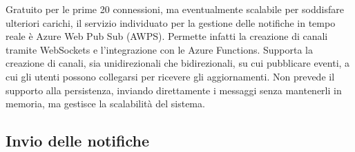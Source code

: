 Gratuito per le prime 20 connessioni, 
ma eventualmente scalabile per soddisfare ulteriori carichi, 
il servizio individuato per la gestione delle notifiche in tempo reale è Azure Web Pub Sub (AWPS). 
Permette infatti la creazione di canali tramite WebSockets e l'integrazione con le Azure Functions. 
Supporta la creazione di canali, sia unidirezionali che bidirezionali, su cui pubblicare eventi, 
a cui gli utenti possono collegarsi per ricevere gli aggiornamenti. 
Non prevede il supporto alla persistenza, 
inviando direttamente i messaggi senza mantenerli in memoria,
ma gestisce la scalabilità del sistema.\\

\subsection{Invio delle notifiche}

